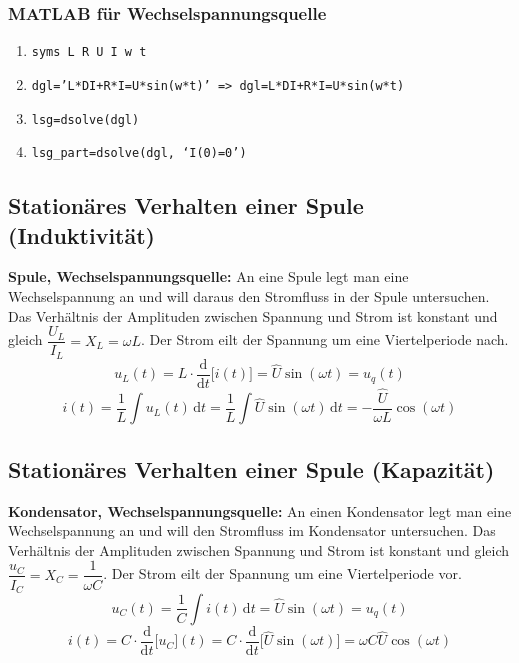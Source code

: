 \subsubsection{MATLAB für Wechselspannungsquelle}
\begin{enumerate}[$\texttt{>}\texttt{>}$]
\item {\color{red}\texttt{syms L R U I w t}}
\item {\color{red}\texttt{dgl='L*DI+R*I=U*sin(w*t)' => dgl=L*DI+R*I=U*sin(w*t)}}
\item {\color{red}\texttt{lsg=dsolve(dgl)}}
\item {\color{red}\texttt{lsg\_part=dsolve(dgl, `I(0)=0')}}
\end{enumerate}
\subsection{Stationäres Verhalten einer Spule (Induktivität)}
\textbf{Spule, Wechselspannungsquelle:} An eine Spule legt man eine Wechselspannung an und will daraus den Stromfluss in der Spule untersuchen. Das Verhältnis der Amplituden zwischen Spannung und Strom ist konstant und gleich $\dfrac{U_L}{I_L}=X_L=\omega L$. Der Strom eilt der Spannung um eine Viertelperiode nach.
\begin{equation}
\boxed{u_L\left(t\right)=L\cdot \dfrac{\text{d}}{\text{d}t}\Big[i\left(t\right)\Big]=\hat{U}\sin\left(\omega t\right)=u_q\left(t\right)}
\end{equation}
\begin{equation}
\boxed{i\left(t\right)=\dfrac{1}{L}\displaystyle \int u_L\left(t\right)\,\text{d}t=\dfrac{1}{L}\displaystyle \int \hat{U}\sin\left(\omega t\right)\,\text{d}t=-\dfrac{\hat{U}}{\omega L}\cos\left(\omega t\right)}
\end{equation}
\subsection{Stationäres Verhalten einer Spule (Kapazität)}
\textbf{Kondensator, Wechselspannungsquelle:} An einen Kondensator legt man eine Wechselspannung an und will den Stromfluss im Kondensator untersuchen. Das Verhältnis der Amplituden zwischen Spannung und Strom ist konstant und gleich $\dfrac{u_C}{I_C}=X_C=\dfrac{1}{\omega C}$. Der Strom eilt der Spannung um eine Viertelperiode vor.
\begin{equation}
\boxed{u_C\left(t\right)=\dfrac{1}{C} \displaystyle \int i\left(t\right)\,\text{d}t=\hat{U}\sin\left(\omega t\right)=u_q\left(t\right)}
\end{equation}
\begin{equation}
\boxed{i\left(t\right)=C\cdot \dfrac{\text{d}}{\text{d}t}\Big[u_C\Big]\left(t\right)=C\cdot \dfrac{\text{d}}{\text{d}t}\Big[\hat{U}\sin\left(\omega t\right)\Big]=\omega C \hat{U}\cos\left(\omega t\right)}
\end{equation}
